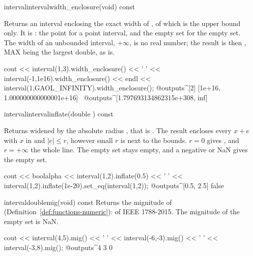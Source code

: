 \begin{defmethod}{interval}{interval}{width\_enclosure}{(void) const}
  \begin{operation}
  \end{operation}
  Returns an interval enclosing the exact width of , of which
   is the upper bound only. It is
  : the point  for a point
  interval, and the empty set for the empty set. The width of an unbounded
  interval, $+\infty$, is no real number; the result is then
  , MAX being the largest double, as
   is.\newinvfive
\begin{example}
cout << interval(1,3).width_enclosure() << ' '
     << interval(-1,1e16).width_enclosure() << endl
     << interval(1,GAOL_INFINITY).width_enclosure();
@outputs^[2] [1e+16, 1.000000000000001e+16]~
@outputs^[1.797693134862315e+308, inf]~
\end{example}
\end{defmethod}

\begin{defmethod}{interval}{interval}{inflate}{(double ) const}
  \begin{operation}
  \end{operation}
  Returns  widened by the absolute radius , that is
  . The result encloses every
  $x+e$ with $x$ in  and $|e|\leq r$, however small $r$ is next
  to the bounds. $r=0$ gives , and $r=+\infty$ the whole line.
  The empty set stays empty, and a negative or NaN  gives the empty
  set.\newinvfive
\begin{example}
cout << boolalpha << interval(1,2).inflate(0.5) << ' '
     << interval(1,2).inflate(1e-20).set_eq(interval(1,2));
@outputs^[0.5, 2.5] false~
\end{example}
\end{defmethod}

\begin{defmethod}{interval}{double}{mig}{(void) const}
  Returns the mignitude of 
  (Definition~\ref{def:functions-numeric}):  of IEEE 1788-2015.
  The mignitude of the empty set is NaN.
\begin{example}
cout << interval(4,5).mig() << ' '
     << interval(-6,-3).mig() << ' '
     << interval(-3,8).mig();
@outputs^4 3 0~
\end{example}
\end{defmethod}


